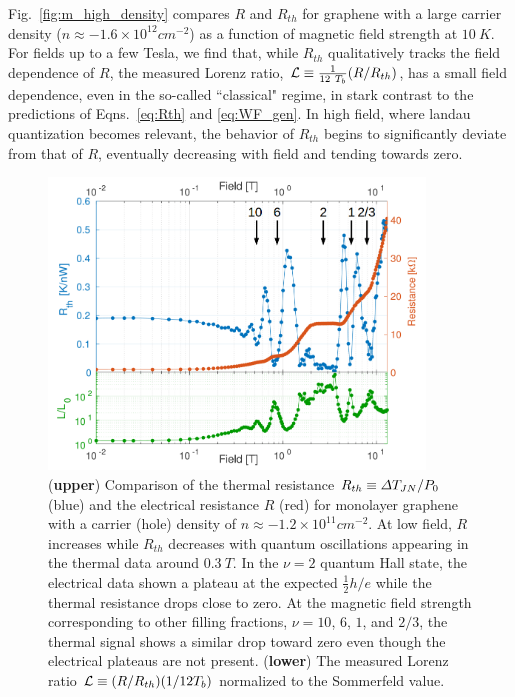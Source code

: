 Fig.~\ref{fig:m_high_density} compares $R$ and $R_{th}$ for graphene with a large carrier density ($n\approx -1.6\times10^{12}cm^{-2}$) as a function of magnetic field strength at $10~K$. For fields up to a few Tesla, we find that, while $R_{th}$ qualitatively tracks the field dependence of $R$, the measured Lorenz ratio, $\mathcal{L}\equiv \frac{1}{12~T_b} (R/R_{th})$, has a small field dependence, even in the so-called ``classical" regime, in stark contrast to the predictions of Eqns.~\ref{eq:Rth} and \ref{eq:WF_gen}. In high field, where landau quantization becomes relevant, the behavior of $R_{th}$ begins to significantly deviate from that of $R$, eventually decreasing with field and tending towards zero. 
\begin{figure}
\centering
\includegraphics[width=100mm]{figures/magneto/low_density.png}
\caption{(\textbf{upper}) Comparison of the thermal resistance $R_{th}\equiv \Delta T_{JN}/P_0$ (blue) and the electrical resistance $R$ (red) for monolayer graphene with a carrier (hole) density of $n\approx-1.2\times10^{11}cm^{-2}$. At low field, $R$ increases while $R_{th}$ decreases with quantum oscillations appearing in the thermal data around $0.3~T$. In the $\nu=2$ quantum Hall state, the electrical data shown a plateau at the expected $\frac{1}{2} h/e$ while the thermal resistance drops close to zero. At the magnetic field strength corresponding to other filling fractions, $\nu=10$, $6$, $1$, and $2/3$, the thermal signal shows a similar drop toward zero even though the electrical plateaus are not present. (\textbf{lower}) The measured Lorenz ratio $\mathcal{L} \equiv (R/R_{th})(1/12T_b)$ normalized to the Sommerfeld value.}
\label{fig:m_low_density}
\end{figure}
